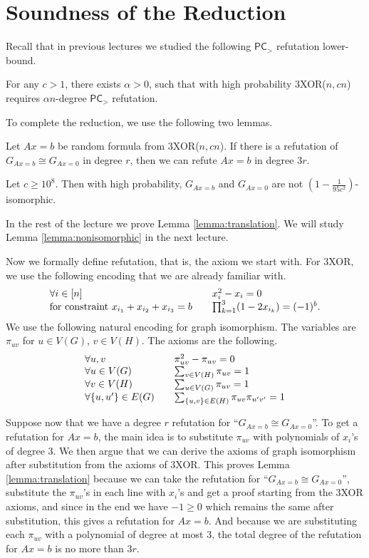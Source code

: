 \documentclass[a4paper,twoside,justified]{tufte-handout}
\begin{document}
\section{Soundness of the Reduction}
Recall that in previous lectures we studied the following $\mathsf{PC}_{>}$ refutation lower-bound.
\begin{lemma}
  For any $c>1$, there exists $\alpha>0$, such that with high probability
  3XOR($n,cn$) requires $\alpha n$-degree $\mathsf{PC}_{>}$ refutation.
\end{lemma}
To complete the reduction, we use the following two lemmas.
\begin{lemma}\label{lemma:translation}
  Let $Ax=b$ be random formula from 3XOR($n,cn$). If there is a refutation of $G_{Ax=b} \cong G_{Ax=0}$
  in degree $r$, then we can refute $Ax=b$ in degree $3r$.
\end{lemma}
\begin{lemma}\label{lemma:nonisomorphic}
  Let $c \ge 10^8$. Then with high probability, $G_{Ax=b}$ and $G_{Ax=0}$ are not $\left( 1-\frac{1}{95c^2} \right)$-isomorphic.
\end{lemma}
In the rest of the lecture we prove Lemma \ref{lemma:translation}. We will study Lemma \ref{lemma:nonisomorphic} in
the next lecture.

Now we formally define refutation, that is, the axiom we start with.
For 3XOR, we use the following encoding that we are already familiar with.
\[
\left.
\begin{array}{l l}
  \forall i \in [n] &\quad x_i^2-x_i = 0 \\
  \textrm{for constraint } x_{i_1}+x_{i_2}+x_{i_3}=b &\quad \prod_{k=1}^{3}(1-2x_{i_k})=(-1)^b.
\end{array}
\right.
\]
We use the following natural encoding for graph isomorphism. The variables are
$\pi_{uv}$ for $u \in V(G)$, $v \in V(H)$. The axioms are the following.
\[
\left.
\begin{array}{l l}
  \forall u, v &\quad \pi_{uv}^2-\pi_{uv}=0 \\
  \forall u \in V(G) &\quad \sum_{v \in V(H)}\pi_{uv}=1 \\
  \forall v \in V(H) &\quad \sum_{u \in V(G)}\pi_{uv}=1 \\
  \forall \{u,u'\} \in E(G) &\quad \sum_{\{u,v\} \in E(H)} \pi_{uv}\pi_{u'v'}=1
\end{array}
\right.
\]

Suppose now that we have a degree $r$ refutation for ``$G_{Ax=b} \cong G_{Ax=0}$''.
To get a refutation for $Ax=b$, the main idea is to substitute $\pi_{uv}$ with
polynomials of $x_i$'s of degree 3. We then argue that we can derive the axioms of
graph isomorphism after substitution from the axioms of 3XOR. This proves Lemma \ref{lemma:translation}
because we can take the refutation for ``$G_{Ax=b} \cong G_{Ax=0}$'', substitute the $\pi_{uv}$'s in each
line with $x_i$'s and get a proof starting from the 3XOR axioms, and since in the end we have $-1 \ge 0$
which remains the same after substitution, this gives a refutation for $Ax=b$. And because we are substituting
each $\pi_{uv}$ with a polynomial of degree at most 3, the total degree of the refutation for $Ax=b$ is no more than
$3r$.
\end{document}
